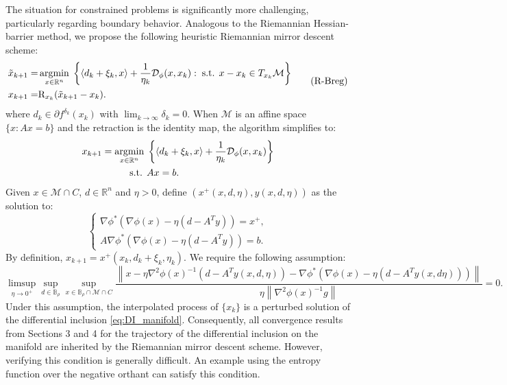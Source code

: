 \documentclass[11pt]{article}
\newcommand{\argmin}{\mathop{\rm argmin}}
\newcommand{\R}{\mathbb R}
\newcommand{\cD}{\mathcal D}
\newcommand{\cM}{\mathcal M}
\def\norm#1{\left\|#1\right\|}
\def\inner#1{\left\langle#1\right\rangle}
\begin{document}
The situation for constrained problems is significantly more challenging, particularly regarding boundary behavior. Analogous to the Riemannian Hessian-barrier method, we propose the following heuristic Riemannian mirror descent scheme:
\begin{equation}
\begin{aligned}
\tilde x_{k+1}=&\argmin_{x\in\R^n}\;\left\{\inner{d_k+\xi_k,x}+\frac{1}{\eta_k}\cD_\phi(x,x_k):\;\text{s.t. }x-x_k\in T_{x_k}\cM\right\}\\
x_{k+1}=&{\rm R}_{x_k}(\tilde x_{k+1}-x_k).
\end{aligned}
\label{R-Breg}
\tag{R-Breg}
\end{equation}
where $d_k\in\partial f^{\delta_k}(x_k)$ with $\lim_{k\to\infty}\delta_k=0$. When $\mathcal{M}$ is an affine space $\{ x : Ax = b \}$ and the retraction is the identity map, the algorithm simplifies to:
\begin{equation}
\begin{aligned}
x_{k+1}=\argmin_{x\in\R^n}\;&\left\{\inner{d_k+\xi_k,x}+\frac{1}{\eta_k}\cD_\phi(x,x_k)\right\}\\
\text{s.t. }&Ax=b.
\end{aligned}
\label{Breg}
\end{equation}
Given $x\in\cM\cap C$, $d\in\R^n$ and $\eta>0$, define $(x^+(x,d,\eta),y(x,d,\eta))$ as the solution to:
\[
\left\{
\begin{aligned}
\nabla\phi^*(\nabla\phi(x)-\eta(d-A^Ty))=x^+,\\
A\nabla\phi^*(\nabla\phi(x)-\eta(d-A^Ty))=b.
\end{aligned}\right.
\]
By definition, $x_{k+1}=x^+(x_k,d_k+\xi_k,\eta_k)$. We require the following assumption:
\begin{equation}
\limsup_{\eta\to0^+}\sup_{d\in\mathbb{B}_\rho}\sup_{x\in\mathbb{B}_\rho\cap\cM\cap C}\frac{\norm{x-\eta\nabla^2\phi(x)^{-1}(d-A^Ty(x,d,\eta))-\nabla\phi^*(\nabla\phi(x)-\eta(d-A^Ty(x,d\eta)))}}{\eta\norm{\nabla^2\phi(x)^{-1}g}}=0.
\label{eq:interpolate_Breg}
\end{equation}
Under this assumption, the interpolated process of $\{x_k\}$ is a perturbed solution of the differential inclusion \eqref{eq:DI_manifold}. Consequently, all convergence results from Sections 3 and 4 for the trajectory of the differential inclusion on the manifold are inherited by the Riemannian mirror descent scheme. However, verifying this condition is generally difficult. An example using the entropy function over the negative orthant can satisfy this condition.
\end{document}
